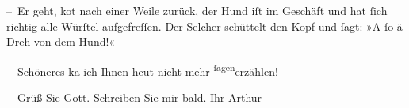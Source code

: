 \pstart
           – Er geht, ko{\geminationm}t nach einer Weile zurück, der Hund iſt im
               Geschäft und hat ſich richtig alle Würſtel aufgefreſſen. Der Selcher schüttelt {\pb}den Kopf und ſagt: »A ſo ä Dreh von dem Hund!«\pend
           
\pstart
           – Schöneres ka{\geminationn} ich Ihnen heut nicht mehr \substVorne{}\textsuperscript{ſagen}\substDazwischen{}erzählen\substHinten{}! –\pend
           
\pstart
           – Grüß Sie Gott. Schreiben Sie mir bald.\pend
           \pstart Ihr \spacefill\mbox{Arthur}\pend{}\endnumbering{}  
      